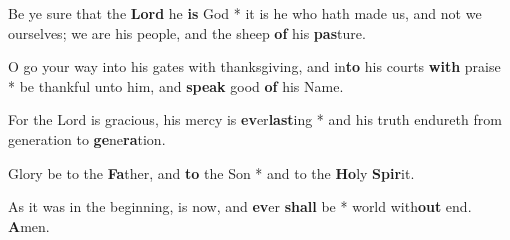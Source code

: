 \begin{multicols}{2}
	Be ye sure that the \textbf{Lord} he \textbf{is} God * it is he who hath made us, and not we ourselves; we are his people, and the sheep \textbf{of} his \textbf{pas}ture.
	
	O go your way into his gates with thanksgiving, and in\textbf{to} his courts \textbf{with} praise * be thankful unto him, and \textbf{speak} good \textbf{of} his Name.
	
	For the Lord is gracious, his mercy is \textbf{ev}er\textbf{last}ing * and his truth endureth from generation to \textbf{ge}ne\textbf{ra}tion.
	
	Glory be to the \textbf{Fa}ther, and \textbf{to} the Son * and to the \textbf{Ho}ly \textbf{Spir}it.
	
	As it was in the beginning, is now, and \textbf{ev}er \textbf{shall} be * world with\textbf{out} end. \textbf{A}men.
\end{multicols}